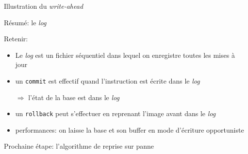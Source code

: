 \begin{frame}{Illustration du \textit{write-ahead}}


\end{frame}

\begin{frame}{Résumé: le \textit{log}}

Retenir:

\vfill

\begin{itemize}

  \item Le \textit{log} est un fichier séquentiel dans lequel
     on enregistre toutes les mises à jour
     
   \item un \texttt{commit} est effectif quand l'instruction est écrite dans le \textit{log}

        $\Rightarrow$ l'état de la base est dans le \textit{log}

   \item un \texttt{rollback} peut s'effectuer en reprenant l'image avant dans le \textit{log}
   
  \item performances: on laisse la base et son buffer en mode d'écriture opportuniste   

\end{itemize}

\vfill

\begin{block}{}
Prochaine étape: l'algorithme de reprise sur panne
\end{block}

\end{frame}



